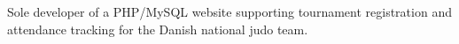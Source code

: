 Sole developer of a PHP/MySQL website supporting tournament registration and attendance tracking for the Danish national judo team.

